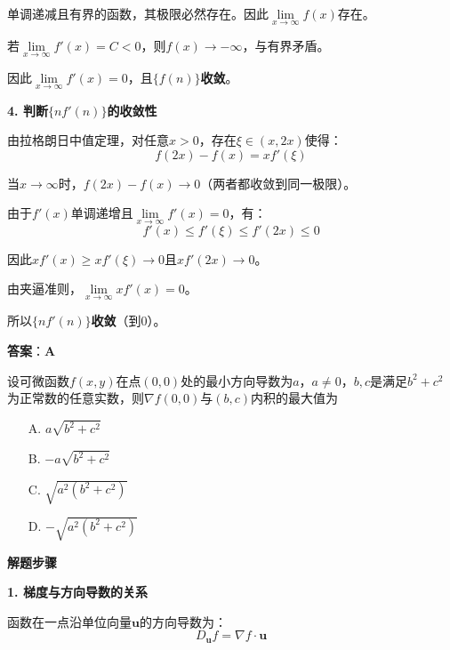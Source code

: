 \documentclass[standard]{ExBook}
\begin{document}
\begin{qitems}
\begin{bbox}
\begin{solution}
            单调递减且有界的函数，其极限必然存在。因此$\lim\limits_{x \to \infty} f(x)$存在。
            
            若$\lim\limits_{x \to \infty} f'(x) = C < 0$，则$f(x) \to -\infty$，与有界矛盾。
            
            因此$\lim\limits_{x \to \infty} f'(x) = 0$，且$\{f(n)\}$\textbf{收敛}。
            
            \textbf{4. 判断$\{nf'(n)\}$的收敛性}
            
            由拉格朗日中值定理，对任意$x>0$，存在$\xi \in (x, 2x)$使得：
            $$f(2x)-f(x) = xf'(\xi)$$
            
            当$x \to \infty$时，$f(2x)-f(x) \to 0$（两者都收敛到同一极限）。
            
            由于$f'(x)$单调递增且$\lim\limits_{x \to \infty} f'(x) = 0$，有：
            $$f'(x) \le f'(\xi) \le f'(2x) \le 0$$
            
            因此$xf'(x) \ge xf'(\xi) \to 0$且$xf'(2x) \to 0$。
            
            由夹逼准则，$\lim\limits_{x \to \infty} xf'(x) = 0$。
            
            所以$\{nf'(n)\}$\textbf{收敛}（到0）。
            
            \textbf{答案}：\textbf{A}
        \end{solution}
    \end{bbox}

    \begin{bbox}
        \qitem 设可微函数$f(x,y)$在点$(0,0)$处的最小方向导数为$a$，$a\ne 0$，$b,c$是满足$b^2+c^2$为正常数的任意实数，则$\nabla f(0,0)$与$(b,c)$内积的最大值为
        \begin{itemize}
            \item[A.] $a\sqrt{b^2+c^2}$
            \item[B.] $-a\sqrt{b^2+c^2}$
            \item[C.] $\sqrt{a^2(b^2+c^2)}$
            \item[D.] $-\sqrt{a^2(b^2+c^2)}$
        \end{itemize}
        \begin{solution}
            \textbf{解题步骤}
            
            \textbf{1. 梯度与方向导数的关系}
            
            函数在一点沿单位向量$\mathbf{u}$的方向导数为：
            $$D_{\mathbf{u}}f = \nabla f \cdot \mathbf{u}$$
            

\end{solution}
\end{bbox}
\end{qitems}
\end{document}
